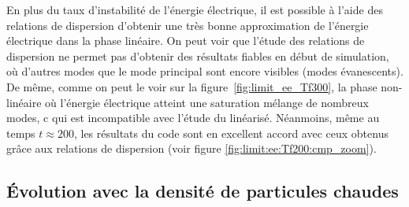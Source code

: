 En plus du taux d'instabilité de l'énergie électrique, il est possible à l'aide des relations de dispersion d'obtenir une très bonne approximation de l'énergie électrique dans la phase linéaire. On peut voir que l'\'etude des relations de dispersion 
ne permet pas d'obtenir des résultats fiables en début de simulation, où d'autres modes que le mode principal sont encore visibles (modes \'evanescents). De m\^eme, comme on peut le voir sur la figure~\ref{fig:limit_ee_Tf300}, la phase non-linéaire où l'énergie électrique atteint une saturation m\'elange de nombreux modes, c qui est incompatible avec l'\'etude du lin\'earis\'e. N\'eanmoins, m\^eme au temps $t\approx 200$, 
les r\'esultats du code sont en excellent accord avec ceux obtenus gr\^ace aux relations de dispersion  (voir figure \ref{fig:limit:ee:Tf200:cmp_zoom}). 


\subsection{Évolution avec la densité de particules chaudes}

